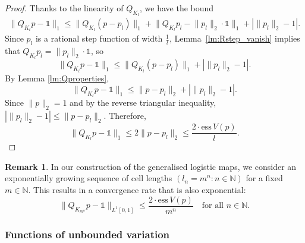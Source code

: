 \documentclass[a4paper]{article}
\theoremstyle{definition}
\newtheorem{remark}[theorem]{Remark}%
\numberwithin{equation}{section}
\numberwithin{theorem}{section}
\newcommand{\ess}{\mathrm{ess}\,}
\begin{document}
{\begin{proof}
    Thanks to the linearity of $Q_{K_l}$, we have the bound
    \begin{align*}
        \lVert Q_{K_l}p-\mathds{1}\rVert_1 \leq \lVert Q_{K_l}(p-p_l)\rVert_1 + \lVert Q_{K_l}p_l-\lVert p_l\rVert_2\cdot\mathds{1}\rVert_1+|\lVert p_l\rVert_2-1|.
    \end{align*}
    Since $p_l$ is a rational step function of width $\frac{1}{l}$, Lemma~\ref{lm:Rstep_vanish} implies that $Q_{K_l}p_l=\lVert p_l\rVert_2\cdot\mathds{1}$, so
    \begin{equation*}
        \lVert Q_{K_l}p-\mathds{1}\rVert_1 \leq \lVert Q_{K_l}(p-p_l)\rVert_1 + |\lVert p_l\rVert_2-1|.
    \end{equation*}
    By Lemma \ref{lm:Qproperties},
    \begin{equation*}
        \lVert Q_{K_l}p-\mathds{1}\rVert_1 \leq \lVert p-p_l\rVert_2 + |\lVert p_l\rVert_2-1|.
    \end{equation*}
    Since $\lVert p\rVert_2=1$ and by the reverse triangular inequality, $|\lVert p_l\rVert_2-1| \leq \lVert p-p_l\rVert_2$. Therefore,
    \begin{equation*}
        \lVert Q_{K_l}p-\mathds{1}\rVert_1 \leq 2\lVert p-p_l\rVert_2 \leq \frac{2\cdot\ess V(p)}{l}.
    \end{equation*}
\end{proof}
\begin{remark}
    In our construction of the generalised logistic maps, we consider an exponentially growing sequence of cell lengths $(l_n=m^n:{n\in\mathbb{N}})$ for a fixed $m\in\mathbb{N}$. This results in a convergence rate that is also exponential:
    \begin{equation*}
        \lVert Q_{K_{m^n}}p-\mathds{1}\rVert_{ L^1[0,1]}\leq\frac{2\cdot\ess V(p)}{m^n}\quad\text{for all $n\in\mathbb{N}$}.
    \end{equation*}
\end{remark}

\subsubsection{Functions of unbounded variation}

}
\end{document}
